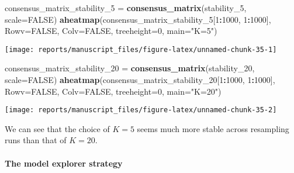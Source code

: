\documentclass[9pt,a4paper,]{extarticle}
\newenvironment{Shaded}{\begin{snugshade}}{\end{snugshade}}
\newcommand{\DataTypeTok}[1]{\textcolor[rgb]{0.13,0.29,0.53}{#1}}
\newcommand{\DecValTok}[1]{\textcolor[rgb]{0.00,0.00,0.81}{#1}}
\newcommand{\KeywordTok}[1]{\textcolor[rgb]{0.13,0.29,0.53}{\textbf{#1}}}
\newcommand{\NormalTok}[1]{#1}
\newcommand{\OperatorTok}[1]{\textcolor[rgb]{0.81,0.36,0.00}{\textbf{#1}}}
\newcommand{\OtherTok}[1]{\textcolor[rgb]{0.56,0.35,0.01}{#1}}
\newcommand{\StringTok}[1]{\textcolor[rgb]{0.31,0.60,0.02}{#1}}
\begin{document}
\begin{Shaded}
\begin{Highlighting}[]
\NormalTok{consensus_matrix_stability_}\DecValTok{5}\NormalTok{ =}\StringTok{ }\KeywordTok{consensus_matrix}\NormalTok{(stability_}\DecValTok{5}\NormalTok{,}
                        \DataTypeTok{scale=}\OtherTok{FALSE}\NormalTok{)}
\KeywordTok{aheatmap}\NormalTok{(consensus_matrix_stability_}\DecValTok{5}\NormalTok{[}\DecValTok{1}\OperatorTok{:}\DecValTok{1000}\NormalTok{, }\DecValTok{1}\OperatorTok{:}\DecValTok{1000}\NormalTok{], }\DataTypeTok{Rowv=}\OtherTok{FALSE}\NormalTok{,}
     \DataTypeTok{Colv=}\OtherTok{FALSE}\NormalTok{,}
     \DataTypeTok{treeheight=}\DecValTok{0}\NormalTok{, }\DataTypeTok{main=}\StringTok{"K=5"}\NormalTok{)}
\end{Highlighting}
\end{Shaded}

\begin{center}\texttt{[image: reports/manuscript\_files/figure-latex/unnamed-chunk-35-1]} \end{center}

\begin{Shaded}
\begin{Highlighting}[]
\NormalTok{consensus_matrix_stability_}\DecValTok{20}\NormalTok{ =}\StringTok{ }\KeywordTok{consensus_matrix}\NormalTok{(stability_}\DecValTok{20}\NormalTok{,}
                         \DataTypeTok{scale=}\OtherTok{FALSE}\NormalTok{)}
\KeywordTok{aheatmap}\NormalTok{(consensus_matrix_stability_}\DecValTok{20}\NormalTok{[}\DecValTok{1}\OperatorTok{:}\DecValTok{1000}\NormalTok{, }\DecValTok{1}\OperatorTok{:}\DecValTok{1000}\NormalTok{], }\DataTypeTok{Rowv=}\OtherTok{FALSE}\NormalTok{,}
     \DataTypeTok{Colv=}\OtherTok{FALSE}\NormalTok{,}
     \DataTypeTok{treeheight=}\DecValTok{0}\NormalTok{, }\DataTypeTok{main=}\StringTok{"K=20"}\NormalTok{)}
\end{Highlighting}
\end{Shaded}

\begin{center}\texttt{[image: reports/manuscript\_files/figure-latex/unnamed-chunk-35-2]} \end{center}

We can see that the choice of \(K=5\) seems much more stable across resampling runs than that of \(K=20\).

\hypertarget{the-model-explorer-strategy}{%
\paragraph{The model explorer strategy}\label{the-model-explorer-strategy}}
\end{document}
